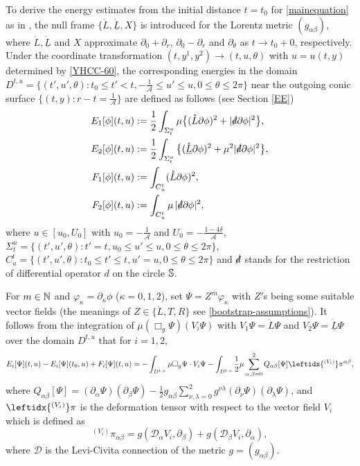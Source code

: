 \documentclass[11pt,twoside]{article}
\def\al{\alpha}
\def\vp{\varphi}
\def\D{\mathscr{D}}
\def\f{\frac}
\def\p{\partial}
\def\dps{\displaystyle}
\begin{document}
To derive the energy estimates from the initial distance
$t=t_0$ for \eqref{mainequation}
as in \cite{Ch1, Sp}, the null frame $\{\mathring L, \mathring{\underline L}, X\}$ is introduced for the Lorentz
metric $(g_{\alpha\beta})$, where $\mathring L, \mathring{\underline L}$ and $X$ approximate $\p_0+\p_r$,  $\p_0-\p_r$ and $\p_\theta$
as $t\to t_0+0$, respectively. Under the coordinate transformation $(t, y^1, y^2)\longrightarrow (t, u, \theta)$ with $u=u(t,y)$ determined by \eqref{YHCC-60}, the corresponding energies in the domain $D^{t,u}=\{({t}', u',\theta): t_0\leq {t}'<{t}, -\frac{1}{\mathcal A}\leq u'\leq u, 0\le \theta\le 2\pi\}$
near the outgoing conic surface
$\{(t,y): r-t=\frac 1{\mathcal A}\}$ are defined as follows (see Section \ref{EE})
\begin{align}\label{YHCC-61}
\begin{split}
E_1[\phi](t, u) &:= \frac{1}{2} \int_{\Sigma_t^{u}} \mu \big\{ (\mathring{L}\p\phi)^2 + |\slashed{d}\p\phi|^2 \big\}, \\
E_2[\phi](t, u) &:= \frac{1}{2} \int_{\Sigma_t^{u}} \big\{ (\mathring{\underline{L}}\p\phi)^2 + \mu^2 |\slashed{d}\p\phi|^2\big\}, \\
F_1[\phi](t, u) &:= \int_{C_{u}^t} (\mathring{L}\p\phi)^2, \\
F_2[\phi](t, u) &:= \int_{C_{u}^t} \mu \, |\slashed{d}\p\phi|^2,\\
\end{split}
\end{align}
where $u\in [u_0, U_0]$ with $u_0=-\f 1{\mathcal A}$ and $U_0=-\f{1-4\delta}{\mathcal A}$,
$\Sigma_{ t}^{u}=\{({ t}',u',\theta): { t}'= t, u_0\leq u'\leq  u, 0\le \theta\le 2\pi\}$,
$C_{u}^{t}=\{({t}',u',\theta): t_0\leq {t}'\leq {t}, u'=u, 0\le \theta\le 2\pi\}$
and $\slashed{d}$ stands for the restriction of differential operator $d$ on the circle $\Bbb S$.


For $m\in\Bbb N$ and $\vp_{\kappa}=\p_{\kappa}\phi$ ($\kappa=0,1,2$), set $\Psi=Z^m\vp_{\kappa}$ with $Z'$s being some suitable vector fields
(the meanings of $Z\in\{\mathring{L}, T, R\}$ see \eqref{bootstrap-assumptions}).
It follows from the integration of $\mu(\Box_g\Psi) (V_i\Psi)$ with $V_1\Psi=\mathring{L}\Psi$ and $V_2\Psi=\mathring{\underline{L}}\Psi$ over
the domain $D^{t,u}$ that for $i=1,2$,
\begin{equation}\label{EI-Y}
E_i[\Psi](t, u)-E_i[\Psi](t_0, u)+F_i[\Psi](t, u)=-\int_{D^{t, u}}\mu\Box_g\Psi\cdot V_i\Psi-\int_{D^{t, u}}\f12\mu \dps\sum_{\alpha,\beta=0}^2Q_{\al\beta}[\Psi]\leftidx{^{(V_i)}}\pi^{\al\beta},
\end{equation}
where
$Q_{\al\beta}[\Psi]=(\p_\al\Psi)(\p_\beta\Psi)-\f12 g_{\al\beta}\dps\sum_{\nu,\lambda=0}^2g^{\nu\lambda}(\p_\nu\Psi)(\p_\lambda\Psi)$,
and $\leftidx{^{(V_i)}}\pi$ is the deformation tensor with respect to the vector field $V_i$ which is defined as
\begin{equation}\label{dt-Y}
{}^{(V_i)}\pi_{\alpha\beta}=g(\mathscr{D}_{\alpha}V_i, \partial_{\beta})+g(\mathscr{D}_{\beta}V_i, \partial_{\alpha}),
\end{equation}
where $\D$ is the Levi-Civita connection of the metric $g=(g_{\alpha\beta})$.
\end{document}
